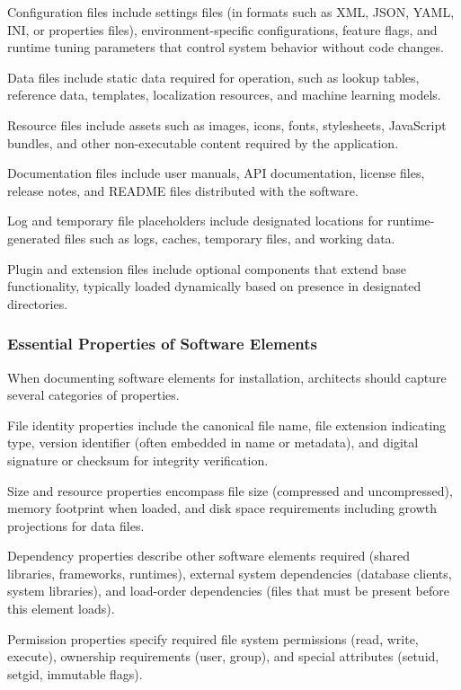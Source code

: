 \documentclass[11pt]{article}
\begin{document}
Configuration files include settings files (in formats such as XML, JSON, YAML, INI, or properties files), environment-specific configurations, feature flags, and runtime tuning parameters that control system behavior without code changes.

Data files include static data required for operation, such as lookup tables, reference data, templates, localization resources, and machine learning models.

Resource files include assets such as images, icons, fonts, stylesheets, JavaScript bundles, and other non-executable content required by the application.

Documentation files include user manuals, API documentation, license files, release notes, and README files distributed with the software.

Log and temporary file placeholders include designated locations for runtime-generated files such as logs, caches, temporary files, and working data.

Plugin and extension files include optional components that extend base functionality, typically loaded dynamically based on presence in designated directories.

\subsubsection{Essential Properties of Software Elements}

When documenting software elements for installation, architects should capture several categories of properties.

File identity properties include the canonical file name, file extension indicating type, version identifier (often embedded in name or metadata), and digital signature or checksum for integrity verification.

Size and resource properties encompass file size (compressed and uncompressed), memory footprint when loaded, and disk space requirements including growth projections for data files.

Dependency properties describe other software elements required (shared libraries, frameworks, runtimes), external system dependencies (database clients, system libraries), and load-order dependencies (files that must be present before this element loads).

Permission properties specify required file system permissions (read, write, execute), ownership requirements (user, group), and special attributes (setuid, setgid, immutable flags).
\end{document}
